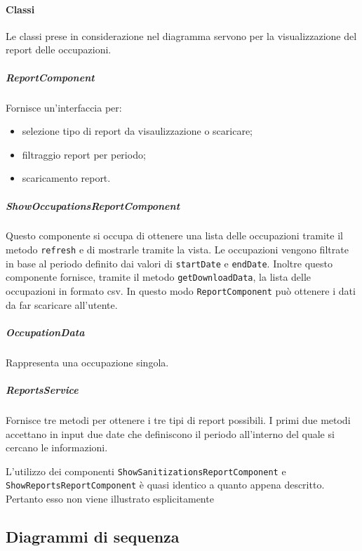 \paragraph{Classi}
Le classi prese in considerazione nel diagramma servono per la visualizzazione del report delle occupazioni.
\subparagraph{ReportComponent}
Fornisce un'interfaccia per:
\begin{itemize}
	\item selezione tipo di report da visaulizzazione o scaricare;
	\item filtraggio report per periodo;
	\item scaricamento report.
\end{itemize}
\subparagraph{ShowOccupationsReportComponent}
Questo componente si occupa di ottenere una lista delle occupazioni tramite il metodo \texttt{refresh} e di mostrarle tramite la vista. Le occupazioni vengono filtrate in base al periodo definito dai valori di \texttt{startDate} e \texttt{endDate}. Inoltre questo componente fornisce, tramite il metodo \texttt{getDownloadData}, la lista delle occupazioni in formato csv. In questo modo \texttt{ReportComponent} può ottenere i dati da far scaricare all'utente.
\subparagraph{OccupationData}
Rappresenta una occupazione singola.
\subparagraph{ReportsService}
Fornisce tre metodi per ottenere i tre tipi di report possibili. I primi due metodi accettano in input due date che definiscono il periodo all'interno del quale si cercano le informazioni.

L'utilizzo dei componenti \texttt{ShowSanitizationsReportComponent} e \texttt{ShowReportsReportComponent} è quasi identico a quanto appena descritto. Pertanto esso non viene illustrato esplicitamente

\subsection{Diagrammi di sequenza}

